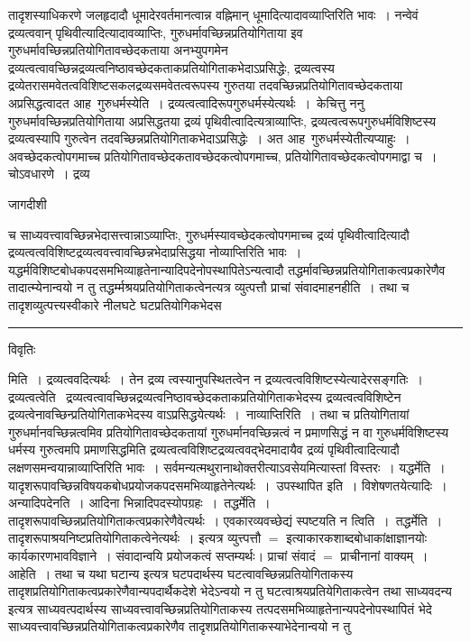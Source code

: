\documentclass[10pt, openany]{book}
\begin{document}
{तादृशस्याधिकरणे जलहृदादौ धूमादेरवर्तमानत्वान्न वह्निमान् धूमादित्यादावव्याप्तिरिति भावः~। नन्वेवं द्रव्यत्ववान् पृथिवीत्यादित्यादावव्याप्तिः, गुरुधर्मावच्छिन्नप्रतियोगिताया इव गुरुधर्मावच्छिन्नप्रतियोगितावच्छेदकताया अनभ्युपगमेन द्रव्यत्वत्वावच्छिन्नद्रव्यत्वनिष्ठावच्छेदकताकप्रतियोगिताकभेदाऽप्रसिद्धेः, द्रव्यत्वस्य द्रव्येतरासमवेतत्वविशिष्टसकलद्रव्यसमवेतत्वरूपस्य गुरुतया तदवच्छिन्नप्रतियोगितावच्छेदकताया अप्रसिद्धत्वादत आह\textemdash\ {\la गुरुधर्मस्येति~।}
द्रव्यत्वत्वादिरूपगुरुधर्मस्येत्यर्थः~।~{\la केचित्तु} ननु गुरुधर्मावच्छिन्नप्रतियोगिताया अप्रसिद्धतया द्रव्यं पृथिवीत्वादित्यत्राव्याप्तिः, द्रव्यत्वत्वरूपगुरुधर्मविशिष्टस्य
द्रव्यत्वस्यापि गुरुत्वेन तदवच्छिन्नप्रतियोगिताकभेदाऽप्रसिद्धेः~। अत आह\textemdash\ गुरुधर्मस्येतीत्यप्याहुः~। अवच्छेदकत्वोपगमाच्च प्रतियोगितावच्छेदकतावच्छेदकत्वोपगमाच्च, प्रतियोगितावच्छेदकत्वोपगमाद्वा च~। चोऽवधारणे~। द्रव्य
\newpage
\begin{center} जागदीशी \end{center}
{\la च साध्यवत्त्वावच्छिन्नभेदासत्त्वान्नाऽव्याप्तिः, गुरुधर्मस्यावच्छेदकत्वोपगमाच्च द्रव्यं पृथिवीत्वादित्यादौ द्रव्यत्वत्वविशिष्टद्रव्यत्ववत्त्वावच्छिन्नभेदाप्रसिद्धया नोव्याप्तिरिति भावः~। यद्धर्मविशिष्टबोधकपदसमभिव्याहृतेनान्यादिपदेनोपस्थापितेऽन्यत्वादौ तद्धर्मावच्छिन्नप्रतियोगिताकत्वप्रकारेणैव तादात्म्येनान्वयो न तु तद्धर्म्मश्रयप्रतियोगिताकत्वेनत्यत्र व्युत्पत्तौ प्राचां संवादमाह\textemdash नहीति~। तथा च तादृशव्युत्पत्त्यस्वीकारे नीलघटे घटप्रतियोगिकभेदस}\\
\hrule
\begin{center}     विवृतिः \end{center}
{\la मिति~।} द्रव्यत्ववदित्यर्थः~। तेन द्रव्य त्वस्यानुपस्थितत्वेन न द्रव्यत्वत्वविशिष्टस्येत्यादेरसङ्गतिः~। द्रव्यत्वत्वेति~ द्रव्यत्वत्वावच्छिन्नद्रव्यत्वनिष्ठावच्छेदकताकप्रतियोगिताकभेदस्य द्रव्यत्वत्वविशिष्टेन द्रव्यत्वेनावच्छिन्प्रतियोगिताकभेदस्य वाऽप्रसिद्धयेत्यर्थः~।~{\la नाव्याप्तिरिति~।} तथा च प्रतियोगितायां गुरुधर्मानवच्छिन्नत्वमिव प्रतियोगितावच्छेदकतायां गुरुधर्मानवच्छिन्नत्वं न प्रमाणसिद्धं न वा गुरुधर्मविशिष्टस्य धर्मस्य गुरुत्वमपि प्रमाणसिद्धमिति
द्रव्यत्वत्वविशिष्टद्रव्यत्ववद्भेदमादायैव द्रव्यं पृथिवीत्वादित्यादौ लक्षणसमन्वयान्नाव्याप्तिरिति भावः~। सर्वमन्यत्मथुरानाथोक्तरीत्याऽवसेयमित्यास्तां विस्तरः~। यद्धर्मेति~।
यादृशरूपावच्छिन्नविषयकबोधप्रयोजकपदसमभिव्याहृतेनेत्यर्थः~।~{\la उपस्थापित इति~।} विशेषणतयेत्यादिः~। अन्यादिपदेनति~। आदिना भिन्नादिपदस्योपग्रहः~।~{\la तद्धर्मेति~।} तादृशरूपावच्छिन्नप्रतियोगिताकत्वप्रकारेणैवेत्यर्थः~। एवकारव्यवच्छेद्यं स्पष्टयति न त्विति~।~{\la तद्धर्मेति~।}
तादृशरूपाश्रयनिष्टप्रतियोगिताकत्वेनेत्यर्थः~। इत्यत्र व्युत्त्पत्तौ $=$ इत्याकारकशाब्दबोधाकांक्षाज्ञानयोः कार्यकारणभावविज्ञाने~। संवादान्वयि प्रयोजकत्वं सप्तम्यर्थः। प्राचां संवादं  $=$ प्राचीनानां वाक्यम्~। आहेति~। तथा च यथा घटान्य इत्यत्र घटपदार्थस्य घटत्वावच्छिन्नप्रतियोगिताकस्य तादृशप्रतियोगिताकत्वप्रकारेणैवान्यपदार्थैकदेशे भेदेऽन्वयो न तु घटत्वाश्रयप्रतियेगिताकत्वेन तथा साध्यवदन्य  इत्यत्र साध्यवत्पदार्थस्य साध्यवत्त्वावच्छिन्नप्रतियोगिताकस्य तत्पदसमभिव्याहृतेनान्यपदेनोपस्थापितं भेदे साध्यवत्त्वावच्छिन्नप्रतियोगिताकत्वप्रकारेणैव तादृशप्रतियोगिताकस्याभेदेनान्वयो न तु
}
\end{document}
